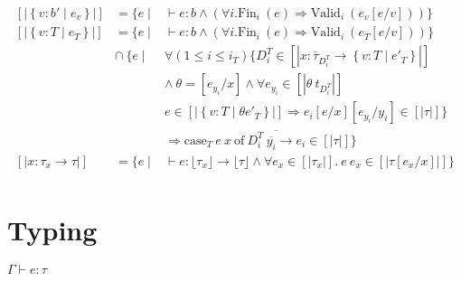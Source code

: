 \documentclass[10pt,a4paper]{article}
\newcommand\dcti{\dct{i}}
\newcommand\dct[1]{\ensuremath{D^T_{#1}}}
\newcommand\eapp[2]{\ensuremath{#1 \ #2}}
\newcommand\edata[2]{\ensuremath{#1 \ #2}}
\newcommand\ecase[5]{\ensuremath{\text{case}_T\ #1\ #2\ \text{of}\ \overline{\edata{#3}{#4} \rightarrow #5}}}
\newcommand\etrue{\ensuremath{\text{true}}}
\newcommand\tref[3]{\ensuremath{\left\lbrace {#1} \colon {#2} \mid {#3} \right\rbrace}}
\newcommand\tconref[4]{\tref{#3}{\tcon{#1}{#2}}{#4}}
\newcommand\tcon[2]{\ensuremath{#1\ #2}}
\newcommand\tfun[3]{\ensuremath{#1\colon #2 \rightarrow #3}}
\newcommand\tfunref[5]{\tfun{#1}{#2}{#3}}
\newcommand\validi[1]{\ensuremath{\text{Valid}_{i}\ (#1)}}
\newcommand\fini[1]{\ensuremath{\text{Fin}_{i}\ (#1)}}
\newcommand\generalconditionInterp[2]
	{\ensuremath{(\forall i. \fini{#1} \Rightarrow \validi{#2})}}
\newcommand\tforalli[1]{\ensuremath{\forall (1\leq i\leq i_{#1})}}
\newcommand\ty[1]{\ensuremath{\text{ty}({#1})}}
\newcommand\sub[2]{\ensuremath{\left[ #2 / #1 \right]}}
\newcommand\erase[1]{\ensuremath{\lfloor #1 \rfloor}}
\newcommand\interp[1]{\ensuremath{[|#1|]}}
\newcommand\evals[2]{\ensuremath{#1 \hookrightarrow^\star #2}}
\newcommand\hastype[3]{\ensuremath{#1 \vdash #2 : #3}}
\begin{document}
$$
\begin{array}{lll}
\interp{\tref{v}{b'}{e_v}} &=
	\{e \mid & \hastype{}{e}{b} 
	\land 
	\generalconditionInterp{e}{e_v\sub{v}{e}} 
	\}\\
\interp{\tref{v}{T}{e_T}} &=
	\{e \mid & \hastype{}{e}{b} 
	\land 
	\generalconditionInterp{e}{e_T\sub{v}{e}} 
	\}\\
	&\cap\
	\{ e \mid & \tforalli{T} \{
		\dcti \in \interp{\overline{x\colon\tau_{\dcti}} \rightarrow \tref{v}{T}{e'_T}}\\
		&& \land\ \theta = \sub{x}{e_{y_i}} \land \forall e_{y_i} \in \interp{\theta\ t_{\dcti}} \\
		&& e \in \interp{\tref{v}{T}{\theta e'_T}} 
				\Rightarrow e_i\sub{x}{e}\sub{y_i}{e_{y_i}} \in \interp{\tau}	
	\} \\
	&&\Rightarrow \ecase{e}{x}{\dcti}{\overline{y_i}}{e_i} \in \interp{\tau}
	\}
	\\
\interp{\tfunref{x}{\tau_x}{\tau}{v}{e_v}} &=
	\{e \mid & \hastype{}{e}{\erase{\tau_x} \rightarrow \erase{\tau}} 
	\land 
	\forall e_x \in \interp{\tau_x}. \
	 \eapp{e}{e_x} \in \interp{\tau\sub{x}{e_x}} 
	 \}\\
\end{array}
$$

\section*{Typing}
\hfill\mbox{\hastype{\Gamma}{e}{\tau}}
\end{document}
